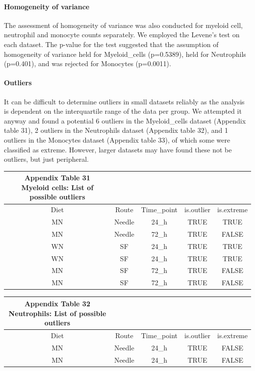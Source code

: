 \documentclass[
  12pt,
  letterpaper,
]{article}
\begin{document}
\paragraph{Homogeneity of variance}\label{homogeneity-of-variance-1}

The assessment of homogeneity of variance was also conducted for myeloid cell, neutrophil and monocyte counts separately. We employed the Levene's test on each dataset. The p-value for the test suggested that the assumption of homogeneity of variance held for Myeloid\_cells (p=0.5389), held for Neutrophils (p=0.401), and was rejected for Monocytes (p=0.0011).

\paragraph{Outliers}\label{outliers-1}

It can be difficult to determine outliers in small datasets reliably as the analysis is dependent on the interquartile range of the data per group. We attempted it anyway and found a potential 6 outliers in the Myeloid\_cells dataset (Appendix table 31), 2 outliers in the Neutrophils dataset (Appendix table 32), and 1 outliers in the Monocytes dataset (Appendix table 33), of which some were classified as extreme. However, larger datasets may have found these not be outliers, but just peripheral.

\begingroup
\fontsize{12.0pt}{14.4pt}\selectfont
\begin{longtable}{ccccc}
\caption*{
{\large \textbf{Appendix Table 31}} \\ 
{\small \textbf{Myeloid cells: List of possible outliers}}
} \\ 
\toprule
{Diet} & {Route} & Time\_point & {is.outlier} & {is.extreme} \\ 
\midrule\addlinespace[2.5pt]
MN & Needle & 24\_h & TRUE & TRUE \\ 
MN & Needle & 72\_h & TRUE & FALSE \\ 
WN & SF & 24\_h & TRUE & TRUE \\ 
WN & SF & 24\_h & TRUE & TRUE \\ 
MN & SF & 72\_h & TRUE & FALSE \\ 
MN & SF & 72\_h & TRUE & FALSE \\ 
\bottomrule
\end{longtable}
\endgroup

\begingroup
\fontsize{12.0pt}{14.4pt}\selectfont
\begin{longtable}{ccccc}
\caption*{
{\large \textbf{Appendix Table 32}} \\ 
{\small \textbf{Neutrophils: List of possible outliers}}
} \\ 
\toprule
{Diet} & {Route} & Time\_point & {is.outlier} & {is.extreme} \\ 
\midrule\addlinespace[2.5pt]
MN & Needle & 24\_h & TRUE & FALSE \\ 
MN & Needle & 24\_h & TRUE & FALSE \\ 
\bottomrule
\end{longtable}
\endgroup
\end{document}
